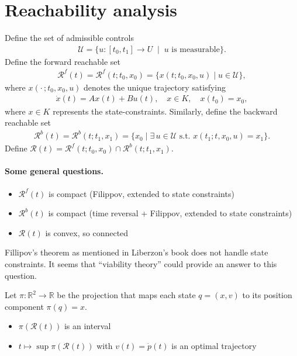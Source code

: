 \documentclass{article}
\theoremstyle{definition}
\begin{document}
\section*{Reachability analysis}

Define the set of admissible controls
\begin{align}
  \mathcal{U} = \{ u : [t_0, t_1] \rightarrow U \; \mid \; u \text{ is measurable} \} .
\end{align}
Define the forward reachable set
\begin{align}
  \mathcal{R}^f(t) = \mathcal{R}^f(t ; t_0, x_0) = \{ x(t ; t_0, x_0, u) \mid u \in \mathcal{U} \} ,
\end{align}
where $x(\cdot \, ; t_0, x_0, u)$ denotes the unique trajectory satisfying
\begin{align}
  \dot{x}(t) = Ax(t) + Bu(t), \quad x \in K, \quad  x(t_0) = x_0 ,
\end{align}
where $x \in K$ represents the state-constraints.
%
Similarly, define the backward reachable set
\begin{align}
  \mathcal{R}^b(t) = \mathcal{R}^b(t ; t_1, x_1) = \{ x_0 \mid \exists \, u \in \mathcal{U} \text{ s.t. } x(t_1 ; t, x_0, u) = x_1 \} .
\end{align}
%
Define $\mathcal{R}(t) = \mathcal{R}^f(t; t_0, x_0) \cap \mathcal{R}^b(t; t_1, x_1)$.

\paragraph{Some general questions.}

\begin{itemize}
  \item $\mathcal{R}^f(t)$ is compact (Filippov, extended to state constraints)
  \item $\mathcal{R}^b(t)$ is compact (time reversal + Filippov, extended to state constraints)
  \item $\mathcal{R}(t)$ is convex, so connected
\end{itemize}
Fillipov's theorem as mentioned in Liberzon's book does not handle state constraints.
It seems that ``viability theory'' could provide an answer to this question.

Let $\pi : \mathbb{R}^2 \rightarrow \mathbb{R}$ be the projection that maps each
state $q = (x, v)$ to its position component $\pi(q) = x$.
\begin{itemize}
  \item $\pi(\mathcal{R}(t))$ is an interval
  \item $t \mapsto \sup \pi(\mathcal{R}(t))$ with $v(t) = \dot{p}(t)$ is an optimal
        trajectory
\end{itemize}
\end{document}
